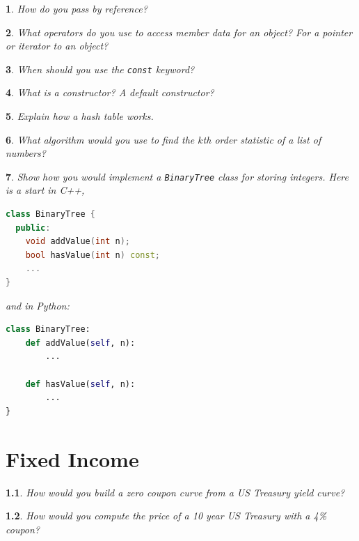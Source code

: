 \documentclass{report}
\newtheorem{problem}{}
\numberwithin{problem}{chapter} %
\begin{document}
\begin{problem}
How do you pass by reference?
\end{problem}

\begin{problem}
What operators do you use to access member data for an object? For a pointer or iterator to an object?
\end{problem}

\begin{problem}
When should you use the \verb|const| keyword?
\end{problem}

\begin{problem}
What is a constructor? A default constructor? 
\end{problem}

\begin{problem}
Explain how a hash table works.
\end{problem}

\begin{problem}
What algorithm would you use to find the $k$th order statistic of a list of numbers? 
\end{problem}

\begin{problem}
Show how you would implement a \verb|BinaryTree| class for storing integers. Here is a start in C++,
\begin{lstlisting}[language=C++]
class BinaryTree {
  public:
    void addValue(int n);
    bool hasValue(int n) const;
    ...
}
\end{lstlisting}
and in Python:
\begin{lstlisting}[language=python]
class BinaryTree:
	def addValue(self, n):
   		...
		
	def hasValue(self, n):
   		...
}
\end{lstlisting}

\end{problem}



\chapter{Fixed Income}

\begin{problem}
How would you build a zero coupon curve from a US Treasury yield curve?
\end{problem}

\begin{problem}
How would you compute the price of a 10 year US Treasury with a 4\% coupon?
\end{problem}
\end{document}
